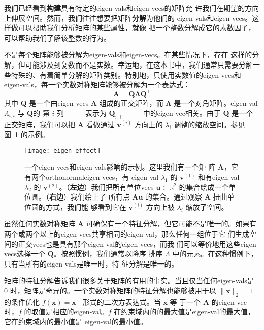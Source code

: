 我们已经看到\textbf{构建}具有特定的\gls*{eigen-vals}和\gls*{eigen-vecs}的矩阵允
许我们在期望的方向上伸展空间。然而，我们往往想要把矩阵\textbf{分解}为他们的
\gls*{eigen-vals}和\gls*{eigen-vecs}。这样做可以帮助我们分析矩阵的某些属性，就像
把一个整数分解成它的素数因子，可以帮助我们了解该整数的行为。

不是每个矩阵能够被分解为\gls*{eigen-vals}和\gls*{eigen-vecs}。在某些情况下，存在
这样的分解，但可能涉及到复数而不是实数。幸运地，在这本书中，我们通常只需要分解一
些特殊的、有着简单分解的矩阵类别。特别地，只使用实数值的\gls*{eigen-vecs}和
\gls*{eigen-vals}，每一个实数对称矩阵能够被分解为一个表达式：
\begin{equation}
  \pmb{A} = \pmb{Q}\pmb{\Lambda}\pmb{Q}^{\top}
\end{equation}
其中 $\pmb{Q}$ 是一个由\gls*{eigen-vecs} $\pmb{A}$ 组成的正交矩阵，而
$\pmb{\Lambda}$ 是一个对角矩阵。\gls*{eigen-val} $\Lambda_{i,i}$ 与 $\pmb{Q}$的
第 $i$ 列~——~表示为 $\pmb{Q}_{:,i}$~——~中的\gls*{eigen-vec}相关。由于 $\pmb{Q}$
是一个正交矩阵，我们可以把 $\pmb{A}$ 看做通过 $\pmb{v}^{(i)}$ 方向上的
$\lambda_i$ 调整的缩放空间。参见
图~\ref{fig:effect_of_eigenvectors_and_eigenvalues} 的示例。

\begin{figure}[h]
  \centering
  \texttt{[image: eigen\_effect]}
  \caption{一个\gls*{eigen-vecs}和\gls*{eigen-vals}影响的示例。这里我们有一个矩
    阵 $\pmb{A}$，它有两个\gls*{orthonormal}\gls*{eigen-vecs}，有
    \gls*{eigen-val} $\lambda_1$ 的 $\pmb{v}^{(1)}$ 和有\gls*{eigen-val}
    $\lambda_2$ 的 $\pmb{v}^{(2)}$。（\textbf{左边}）我们把所有单位\gls*{vecs}
    $\pmb{u} \in \mathbb{R}^2$ 的集合绘成一个单位圆。（\textbf{右边}）我们绘上了
    所有点 $\pmb{A}\pmb{u}$ 的集合。通过观察 $\pmb{A}$ 扭曲单位圆的方式，我们能
    够看到它在 $\pmb{v}^{(i)}$ 方向上被 $\lambda_i$ 缩放了空间。
    \label{fig:effect_of_eigenvectors_and_eigenvalues}}
\end{figure}

虽然任何实数对称矩阵 $\pmb{A}$ 可确保有一个特征分解，但它可能不是唯一的。如果有
两个或两个以上的\gls*{eigen-vecs}共享相同的\gls*{eigen-val}，那么任何一组位于它
们生成空间的正交\gls*{vecs}也是具有那个\gls*{eigen-val}的\gls*{eigen-vecs}，而我
们可以等价地用这些\gls*{eigen-vecs}选择一个 $\pmb{Q}$。按照惯例，我们通常以降序
排序 $\Lambda$ 中的元素。在这种惯例下，只有当所有的\gls*{eigen-vals}是唯一时，特
征分解是唯一的。

矩阵的特征分解告诉我们很多关于矩阵的有用的事实。当且仅当任何\gls*{eigen-vals}是
$0$ 时，矩阵是奇异的。一个实数对称矩阵的特征分解也能够被用于以 $\|\pmb{x}\|_2 =
1$ 的条件优化 $f (\pmb{x}) = \pmb{x}^{\top}$ 形式的二次方表达式。当 $\pmb{x}$ 等
于一个 $\pmb{A}$ 的\gls*{eigen-vec}时，$f$ 的取值是相应的\gls*{eigen-val}。$f$
在约束域内的的最大值是\gls*{eigen-val}的最大值，它在约束域内的最小值是
\gls*{eigen-val}的最小值。

